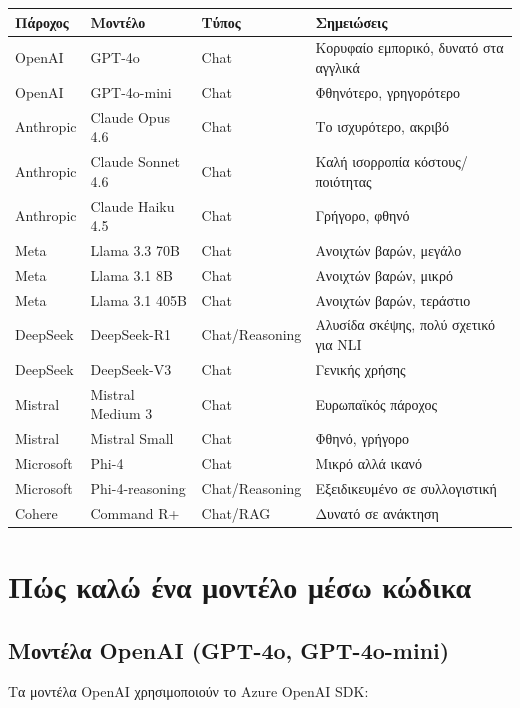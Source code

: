 \documentclass[11pt,a4paper]{article}
\begin{document}
\begin{table}[h!]
\centering\small
\begin{tabularx}{\textwidth}{l l l X}
\toprule
\textbf{Πάροχος} & \textbf{Μοντέλο} & \textbf{Τύπος} & \textbf{Σημειώσεις} \\
\midrule
OpenAI & GPT-4o & Chat & Κορυφαίο εμπορικό, δυνατό στα αγγλικά \\
OpenAI & GPT-4o-mini & Chat & Φθηνότερο, γρηγορότερο \\
Anthropic & Claude Opus 4.6 & Chat & Το ισχυρότερο, ακριβό \\
Anthropic & Claude Sonnet 4.6 & Chat & Καλή ισορροπία κόστους/ποιότητας \\
Anthropic & Claude Haiku 4.5 & Chat & Γρήγορο, φθηνό \\
Meta & Llama 3.3 70B & Chat & Ανοιχτών βαρών, μεγάλο \\
Meta & Llama 3.1 8B & Chat & Ανοιχτών βαρών, μικρό \\
Meta & Llama 3.1 405B & Chat & Ανοιχτών βαρών, τεράστιο \\
DeepSeek & DeepSeek-R1 & Chat/Reasoning & Αλυσίδα σκέψης, πολύ σχετικό για NLI \\
DeepSeek & DeepSeek-V3 & Chat & Γενικής χρήσης \\
Mistral & Mistral Medium 3 & Chat & Ευρωπαϊκός πάροχος \\
Mistral & Mistral Small & Chat & Φθηνό, γρήγορο \\
Microsoft & Phi-4 & Chat & Μικρό αλλά ικανό \\
Microsoft & Phi-4-reasoning & Chat/Reasoning & Εξειδικευμένο σε συλλογιστική \\
Cohere & Command R+ & Chat/RAG & Δυνατό σε ανάκτηση \\
\bottomrule
\end{tabularx}
\end{table}

\section{Πώς καλώ ένα μοντέλο μέσω κώδικα}

\subsection{Μοντέλα OpenAI (GPT-4o, GPT-4o-mini)}

Τα μοντέλα OpenAI χρησιμοποιούν το Azure OpenAI SDK:
\end{document}

